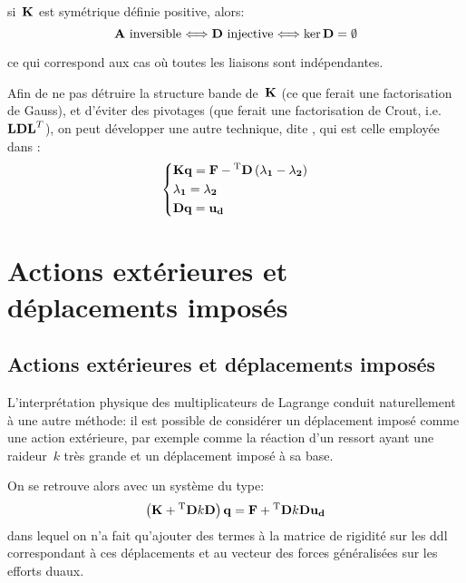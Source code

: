 \begin{theoreme}
si~$\MM{K}$ est symétrique définie positive, alors:
\begin{equation}
\MM{A} \text{ inversible} \Longleftrightarrow \MM{D} \text{ injective} \Longleftrightarrow \ker \MM{D} = \emptyset
\end{equation}
\end{theoreme}
ce qui correspond aux cas où toutes les liaisons sont indépendantes.

\bigskipvm
Afin de ne pas détruire la structure bande de~$\MM{K}$ (ce que ferait une factorisation de Gauss), 
et d'éviter des pivotages (que ferait une factorisation de Crout, i.e.~$\MM{LDL}^T$), on peut développer une autre technique, dite , qui est celle employée dans \castem:
\begin{equation}
\left\{\begin{aligned}
&\MM{K}\VV{q} = \VV{F} - \MMT{D}\left(\VV{\lambda_1} - \VV{\lambda_2}\right) \\
&\VV{\lambda_1} = \VV{\lambda_2} \\ 
&\MM{D}\VV{q} = \VV{u_d}
\end{aligned}\right.
\end{equation}

\medskip
\ifVersionAvecExemplesSepares
  \section{Actions extérieures et déplacements imposés}
\else
  \subsection{Actions extérieures et déplacements imposés}
\fi

L'interprétation physique des multiplicateurs de Lagrange conduit naturellement à une autre méthode:
il est possible de considérer un déplacement imposé comme une action extérieure, par exemple comme
la réaction d'un ressort ayant une raideur~$k$ très grande et un déplacement imposé à sa base.

\medskip
On se retrouve alors avec un système du type:
\begin{equation}
\left(\MM{K} + \MMT{D}k\MM{D}\right) \VV{q} = \VV{F} + \MMT{D}k\MM{D}\VV{u_d}
\end{equation}
dans lequel on n'a fait qu'ajouter des termes à la matrice de rigidité sur les ddl correspondant à ces
déplacements et au vecteur des forces généralisées sur les efforts duaux.

